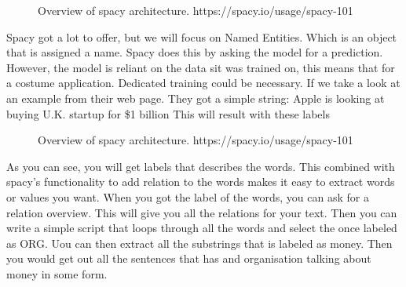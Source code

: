 \begin{figure}[h]
    \caption{Overview of spacy architecture. https://spacy.io/usage/spacy-101}
    \label{fig:figure2.6}
\end{figure}

Spacy got a lot to offer, but we will focus on Named Entities.
Which is an object that is assigned a name.
Spacy does this by asking the model for a prediction.
However, the model is reliant on the data sit was trained on, this means that for a costume application.
Dedicated training could be necessary.
If we take a look at an example from their web page.
They got a simple string: Apple is looking at buying U.K. startup for \$1 billion
This will result with these labels

\begin{figure}[h]
    \caption{Overview of spacy architecture. https://spacy.io/usage/spacy-101}
    \label{fig:figure2.6}
\end{figure}

As you can see, you will get labels that describes the words.
This combined with spacy's functionality to add relation to the words makes it easy to extract words or values you want.
When you got the label of the words, you can ask for a relation overview.
This will give you all the relations for your text.
Then you can write a simple script that loops through all the words and select the once labeled as ORG. Uou can then extract all the substrings that is labeled as money.
Then you would get out all the sentences that has and organisation talking about money in some form. 







